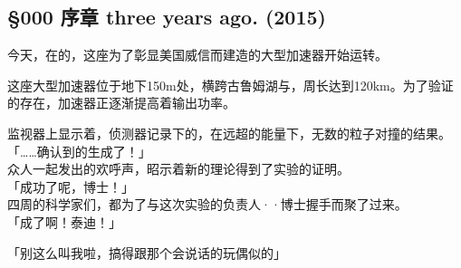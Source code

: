 \subsection{§000 序章 three years ago. (2015)}

今天，在的，这座为了彰显美国威信而建造的大型加速器开始运转。

这座大型加速器位于地下150m处，横跨古鲁姆湖与，周长达到120km。为了验证的存在，加速器正逐渐提高着输出功率。

监视器上显示着，侦测器记录下的，在远超的能量下，无数的粒子对撞的结果。\\

「……确认到的生成了！」\\

众人一起发出的欢呼声，昭示着新的理论得到了实验的证明。\\

「成功了呢，博士！」\\

四周的科学家们，都为了与这次实验的负责人··博士握手而聚了过来。\\

「成了啊！泰迪！」

「别这么叫我啦，搞得跟那个会说话的玩偶似的」\\

